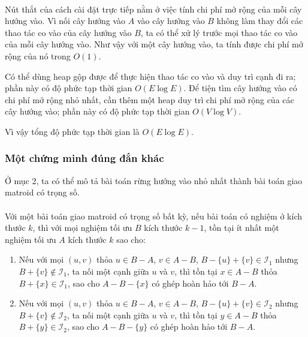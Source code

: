 \documentclass[11pt]{article}
\begin{document}
\paragraph{}
Nút thắt của cách cài đặt trực tiếp nằm ở việc tính chi phí mở rộng của mỗi cây
hướng vào. Vì nối cây hướng vào \(A\) vào cây hướng vào \(B\) không làm thay đổi
các thao tác co vào của cây hướng vào \(B\), ta có thể xử lý trước mọi thao tác
co vào của mỗi cây hướng vào. Như vậy với một cây hướng vào, ta tính được chi
phí mở rộng của nó trong \(O(1)\).

Có thể dùng heap gộp được để thực hiện thao tác co vào và duy trì cạnh đi ra;
phần này có độ phức tạp thời gian \(O(E\log E)\). Để tiện tìm cây hướng vào có
chi phí mở rộng nhỏ nhất, cần thêm một heap duy trì chi phí mở rộng của các cây
hướng vào; phần này có độ phức tạp thời gian \(O(V\log V)\).

Vì vậy tổng độ phức tạp thời gian là \(O(E\log E)\).

\subsubsection{Một chứng minh đúng đắn khác}

Ở mục 2, ta có thể mô tả bài toán rừng hướng vào nhỏ nhất thành bài toán giao
matroid có trọng số.

\paragraph{}
Với một bài toán giao matroid có trọng số bất kỳ, nếu bài toán có nghiệm ở kích
thước \(k\), thì với mọi nghiệm tối ưu \(B\) kích thước \(k-1\), tồn tại ít nhất
một nghiệm tối ưu \(A\) kích thước \(k\) sao cho:

\begin{enumerate}
  \item Nếu với mọi \((u,v)\) thỏa \(u\in B-A\), \(v\in A-B\),
  \(B-\{u\}+\{v\}\in\mathcal{I}_1\) nhưng \(B+\{v\}\notin\mathcal{I}_1\), ta
  nối một cạnh giữa \(u\) và \(v\), thì tồn tại \(x\in A-B\) thỏa
  \(B+\{x\}\in\mathcal{I}_1\), sao cho \(A-B-\{x\}\) có ghép hoàn hảo tới
  \(B-A\).
  \item Nếu với mọi \((u,v)\) thỏa \(u\in B-A\), \(v\in A-B\),
  \(B-\{u\}+\{v\}\in\mathcal{I}_2\) nhưng \(B+\{v\}\notin\mathcal{I}_2\), ta
  nối một cạnh giữa \(u\) và \(v\), thì tồn tại \(y\in A-B\) thỏa
  \(B+\{y\}\in\mathcal{I}_2\), sao cho \(A-B-\{y\}\) có ghép hoàn hảo tới
  \(B-A\).
\end{enumerate}
\end{document}
